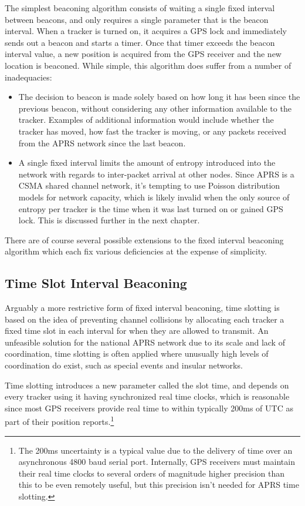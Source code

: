 The simplest beaconing algorithm consists of waiting a single fixed interval
between beacons, and only requires a single parameter that is the beacon interval.
When a tracker is turned on, it acquires a GPS lock and immediately sends out a 
beacon and starts a timer. Once that timer exceeds the beacon interval value, a 
new position is acquired from the GPS receiver and the new location is beaconed.
While simple, this algorithm does suffer from a number of inadequacies:
\begin{itemize}
\item The decision to beacon is made solely based on how long it has been
since the previous beacon, without considering any other information available
to the tracker. Examples of additional information would include whether the 
tracker has moved, how fast the tracker is moving, or any packets received from
the APRS network since the last beacon.
\item A single fixed interval limits the amount of entropy introduced into the
network with regards to inter-packet arrival at other nodes. Since APRS is a 
CSMA shared channel network, it's tempting to use Poisson distribution models
for network capacity, which is likely invalid when the only source of entropy 
per tracker is the time when it was last turned on or gained GPS lock.
This is discussed further in the next chapter.
\end{itemize}

There are of course several possible extensions to the fixed interval beaconing
algorithm which each fix various deficiencies at the expense of simplicity.

\subsection{Time Slot Interval Beaconing}
\label{subsec:timeslot}

Arguably a more restrictive form of fixed interval beaconing, time slotting is 
based on the idea of preventing channel collisions by allocating each tracker
a fixed time slot in each interval for when they are allowed to transmit.
An unfeasible solution for the national APRS network due to its scale and lack
of coordination, time slotting is often applied where unusually high levels of
coordination do exist, such as special events and insular networks.

Time slotting introduces a new parameter called the slot time, and depends on every
tracker using it having synchronized real time clocks, which is reasonable since most
GPS receivers provide real time to within typically 200ms of UTC 
as part of their position reports.\footnote{The 200ms 
	uncertainty is a typical value due to the delivery of time over
an asynchronous 4800 baud serial port. Internally, GPS receivers must maintain 
their real time clocks to several orders of magnitude higher precision than this
to be even remotely useful, but this precision isn't needed for APRS time slotting.}

